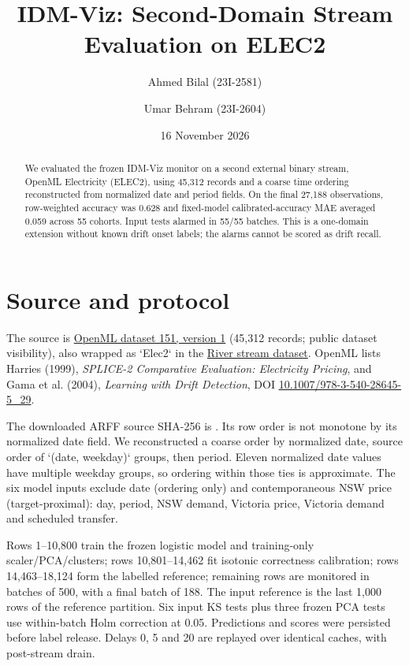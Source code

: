 \documentclass[10pt,a4paper]{article}
\title{IDM-Viz: Second-Domain Stream Evaluation on ELEC2}
\author{Ahmed Bilal (23I-2581) \and Umar Behram (23I-2604)}\date{16 November 2026}
\begin{document}
\maketitle
\begin{abstract}
We evaluated the frozen IDM-Viz monitor on a second external binary stream, OpenML Electricity (ELEC2), using 45,312 records and a coarse time ordering reconstructed from normalized date and period fields. On the final 27,188 observations, row-weighted accuracy was 0.628 and fixed-model calibrated-accuracy MAE averaged 0.059 across 55 cohorts. Input tests alarmed in 55/55 batches. This is a one-domain extension without known drift onset labels; the alarms cannot be scored as drift recall.
\end{abstract}
\section{Source and protocol}
The source is \href{https://www.openml.org/search?id=151}{OpenML dataset 151, version 1} (45,312 records; public dataset visibility), also wrapped as `Elec2` in the \href{https://github.com/online-ml/river/blob/main/river/datasets/elec2.py}{River stream dataset}. OpenML lists Harries (1999), \emph{SPLICE-2 Comparative Evaluation: Electricity Pricing}, and Gama et al. (2004), \emph{Learning with Drift Detection}, DOI \href{https://doi.org/10.1007/978-3-540-28645-5\_29}{10.1007/978-3-540-28645-5\_29}.

The downloaded ARFF source SHA-256 is \texttt{}. Its row order is not monotone by its normalized date field. We reconstructed a coarse order by normalized date, source order of `(date, weekday)` groups, then period. Eleven normalized date values have multiple weekday groups, so ordering within those ties is approximate. The six model inputs exclude date (ordering only) and contemporaneous NSW price (target-proximal): day, period, NSW demand, Victoria price, Victoria demand and scheduled transfer.

Rows 1--10,800 train the frozen logistic model and training-only scaler/PCA/clusters; rows 10,801--14,462 fit isotonic correctness calibration; rows 14,463--18,124 form the labelled reference; remaining rows are monitored in batches of 500, with a final batch of 188. The input reference is the last 1,000 rows of the reference partition. Six input KS tests plus three frozen PCA tests use within-batch Holm correction at 0.05. Predictions and scores were persisted before label release. Delays 0, 5 and 20 are replayed over identical caches, with post-stream drain.
\end{document}
